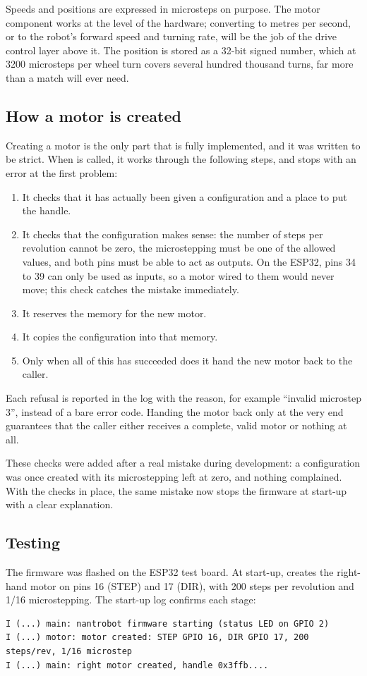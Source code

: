 Speeds and positions are expressed in microsteps on purpose. The motor component works at the level of the hardware; converting to metres per second, or to the robot's forward speed and turning rate, will be the job of the drive control layer above it. The position is stored as a 32-bit signed number, which at 3200 microsteps per wheel turn covers several hundred thousand turns, far more than a match will ever need.

\subsection{How a motor is created}
Creating a motor is the only part that is fully implemented, and it was written to be strict. When  is called, it works through the following steps, and stops with an error at the first problem:

\begin{enumerate}
  \item It checks that it has actually been given a configuration and a place to put the handle.
  \item It checks that the configuration makes sense: the number of steps per revolution cannot be zero, the microstepping must be one of the allowed values, and both pins must be able to act as outputs. On the ESP32, pins 34 to 39 can only be used as inputs, so a motor wired to them would never move; this check catches the mistake immediately.
  \item It reserves the memory for the new motor.
  \item It copies the configuration into that memory.
  \item Only when all of this has succeeded does it hand the new motor back to the caller.
\end{enumerate}

Each refusal is reported in the log with the reason, for example ``invalid microstep 3'', instead of a bare error code. Handing the motor back only at the very end guarantees that the caller either receives a complete, valid motor or nothing at all.

These checks were added after a real mistake during development: a configuration was once created with its microstepping left at zero, and nothing complained. With the checks in place, the same mistake now stops the firmware at start-up with a clear explanation.

\subsection{Testing}
The firmware was flashed on the ESP32 test board. At start-up,  creates the right-hand motor on pins 16 (STEP) and 17 (DIR), with 200 steps per revolution and 1/16 microstepping. The start-up log confirms each stage:

\begin{lstlisting}
I (...) main: nantrobot firmware starting (status LED on GPIO 2)
I (...) motor: motor created: STEP GPIO 16, DIR GPIO 17, 200 steps/rev, 1/16 microstep
I (...) main: right motor created, handle 0x3ffb....
\end{lstlisting}


